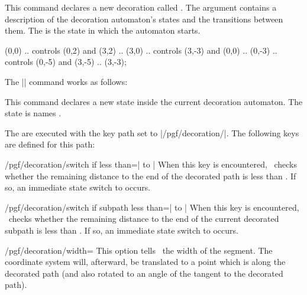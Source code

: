\begin{command}{\pgfdeclaredecoration{}}
  This command declares a new decoration called . The
   argument contains a description of the decoration
  automaton's states and the transitions between them. The
   is the state in which the automaton starts.
  
\begin{codeexample}[]
\tikz\path[decorate, decoration=stars, star point ratio=2, star points=5,
           inner sep=0, minimum size=rnd*10pt+2pt]            
  (0,0) .. controls (0,2)  and (3,2)  .. (3,0)
        .. controls (3,-3) and (0,0)  .. (0,-3)
        .. controls (0,-5) and (3,-5) .. (3,-3);
\end{codeexample}

  The |\state| command works as follows:
  \begin{command}{\state{}}
    This command declares a new state inside the current decoration
    automaton. The state is names .

    The  are executed with the key path set to
    |/pgf/decoration/|. The following keys are defined for this path: 
    \begin{key}{/pgf/decoration/switch if less than=| to |}
      When this key is encountered, \pgfname\ checks whether the
      remaining distance to the end of the decorated path is less than
      . If so, an immediate state switch to  occurs.
    \end{key}
    \begin{key}{/pgf/decoration/switch if subpath less than=| to |}
      When this key is encountered, \pgfname\ checks whether the
      remaining distance to the end of the current decorated subpath is 
      less than . If so, an immediate state switch to 
       occurs.
    \end{key}
    \begin{key}{/pgf/decoration/width=}
      This option tells \pgfname\ the width of the segment.
      The coordinate system will, afterward, be
      translated to a point which is  along the 
      decorated path (and also rotated to an angle of the tangent
      to the decorated path).


\end{key}
\end{command}
\end{command}
